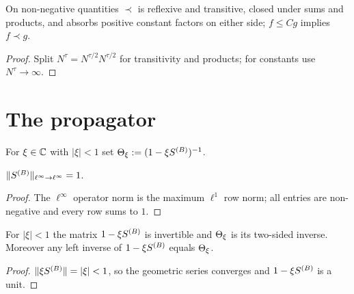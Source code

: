 \begin{lemma}\label{lem:2.1-ii-closure}
  \leanok{}
  On non-negative quantities $\prec$ is reflexive and transitive, closed under sums
  and products, and absorbs positive constant factors on either side; $f\le Cg$
  implies $f\prec g$.
\end{lemma}
\begin{proof}\leanok{}
  Split $N^\tau = N^{\tau/2}N^{\tau/2}$ for transitivity and products; for
  constants use $N^\tau\to\infty$.
\end{proof}

\chapter{The propagator}

\begin{definition}\label{def:Theta}
  \leanok{}
  For $\xi\in\mathbb{C}$ with $|\xi|<1$ set $\Theta_\xi := (1-\xi S^{(B)})^{-1}$.
\end{definition}

\begin{lemma}\label{lem:norm-SB}
  \leanok{}
  $\|S^{(B)}\|_{\ell^\infty\to\ell^\infty}=1$.
\end{lemma}
\begin{proof}\leanok{}
  The $\ell^\infty$ operator norm is the maximum $\ell^1$ row norm; all entries are
  non-negative and every row sums to $1$.
\end{proof}

\begin{lemma}\label{lem:Theta-inv}
  \leanok
  For $|\xi|<1$ the matrix $1-\xi S^{(B)}$ is invertible and $\Theta_\xi$ is its two-sided
  inverse.  Moreover any left inverse of $1-\xi S^{(B)}$ equals $\Theta_\xi$.
\end{lemma}
\begin{proof}\leanok{}
  $\|\xi S^{(B)}\|=|\xi|<1$, so the geometric series converges and $1-\xi S^{(B)}$ is a unit.
\end{proof}

